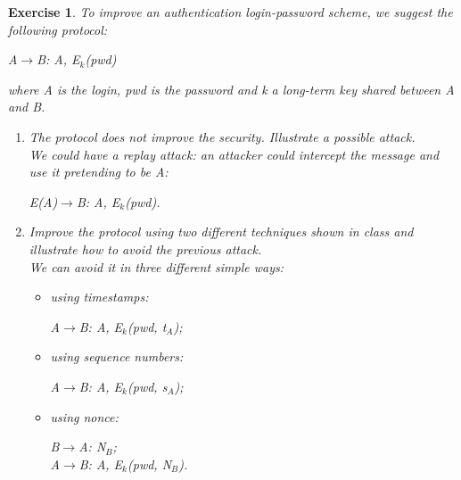 \documentclass[a4paper, 12pt]{report}
\newtheorem{exercise}{\textbf{Exercise}}
\begin{document}
\begin{exercise}
	To improve an authentication login-password scheme, we suggest the following protocol:
	\begin{center}
		A$\rightarrow$B: A, E$_k$(pwd)
	\end{center}
	where A is the login, pwd is the password and k a long-term key shared between A and B.
	\begin{enumerate}
		\item The protocol does not improve the security. Illustrate a possible attack.\\
		We could have a replay attack: an attacker could intercept the message and use it pretending to be A:
		\begin{center}
			E(A)$\rightarrow$B: A, E$_k$(pwd).
		\end{center}
		
		\item Improve the protocol using two different techniques shown in class and illustrate how to avoid the previous attack.\\
		We can avoid it in three different simple ways:
		\begin{itemize}
			\item using timestamps:
			\begin{center}
				A$\rightarrow$B: A, E$_k$(pwd, t$_A$);
			\end{center}
			\item using sequence numbers:
			\begin{center}
				A$\rightarrow$B: A, E$_k$(pwd, s$_A$);
			\end{center}
			\item using nonce:
			\begin{center}
				B$\rightarrow$A: N$_B$;\\
				A$\rightarrow$B: A, E$_k$(pwd, N$_B$).
			\end{center}
		\end{itemize}
	\end{enumerate}
\end{exercise}
\end{document}
